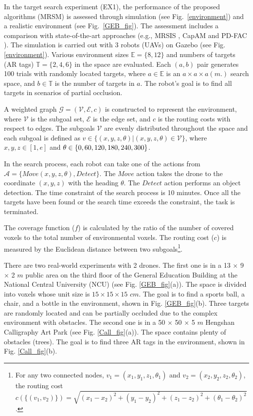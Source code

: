 In the target search experiment (EX1), the performance of the proposed algorithms (MRSM) is assessed through simulation
(see Fig.~\ref{environment}) and a realistic environment (see Fig.~\ref{GEB_fig}).
The assessment includes a comparison with state-of-the-art approaches (e.g., MRSIS \cite{li2024mrsis}, CapAM \cite{paull2022learning} and PD-FAC \cite{sheng2022pd}).
The simulation is carried out with 3 robots (UAVs) on Gazebo (see Fig. \ref{environment}). Various environment sizes $\mathit{\mathbb{E}}=\{8,12\}$ and numbers of targets (AR tags) $\mathit{\mathbb{T}}=\{2,4,6\}$ in the space are evaluated.
Each $(a,b)$ pair generates 100 trials with randomly located targets,
where $a \in \mathit{\mathbb{E}}$ is an $a \times a \times a (m.)$ search space, and $b \in \mathit{\mathbb{T}}$ is the number of targets in $a$.
The robot's goal is to find all targets in scenarios of partial occlusion.

A weighted graph $\mathcal{G}=(\mathcal{V}, \mathcal{E}, c)$ is constructed to represent the environment, where $\mathcal{V}$ is the subgoal set, $\mathcal{E}$ is the edge set, and $c$ is the routing costs with respect to edges.
The subgoals $\mathcal{V}$ are evenly distributed throughout the space and each subgoal is defined as $v\in \{(x,y,z,\theta)|(x,y,z,\theta)\in \mathcal{V}\}$, where $x,y,z\in[1, e]$ and $\theta\in\{0,60,120,\\180,240,300\}$.

In the search process, each robot can take one of the actions from $\mathcal{A}=\{Move(x,y,z,\theta), Detect\}$.
The $Move$ action takes the drone to the coordinate $(x,y,z)$ with the heading $\theta$.
The $Detect$ action performs an object detection.
The time constraint of the search process is 10 minutes.
Once all the targets have been found or the search time exceeds the constraint, the task is terminated.

The coverage function ($f$) is calculated by the ratio of the number of covered voxels to the total number of environmental voxels. The routing cost ($c$) is measured by the Euclidean distance between two subgoals\footnote{For any two connected nodes, $v_1=(x_1,y_1,z_1, \theta_1)$ and $v_2=(x_2,y_2,z_2,\theta_2)$, the routing cost $c(\{(v_1,v_2)\})=\sqrt{(x_1-x_2)^2+(y_1-y_2)^2+(z_1-z_2)^2+(\theta_1-\theta_2)^2}$.}.

There are two real-world experiments with 2 drones.
The first one is in a 13 $\times$ 9 $\times$ 2 $m$ public area on the third floor of the General Education Building at the National Central University (NCU) (see Fig. \ref{GEB_fig}(a)).
The space is divided into voxels whose unit size is $15 \times 15 \times 15$ $cm$.
The goal is to find a sports ball, a chair, and a bottle in the environment, shown in Fig. \ref{GEB_fig}(b).
Three targets are randomly located and can be partially occluded due to the complex environment with obstacles.
The second one is in a 50 $\times$ 50 $\times$ 5 $m$ Hengshan Calligraphy Art Park (see Fig. \ref{Call_fig}(a)).
The space contains plenty of obstacles (trees). The goal is to find three AR tags in the environment, shown in Fig. \ref{Call_fig}(b).

